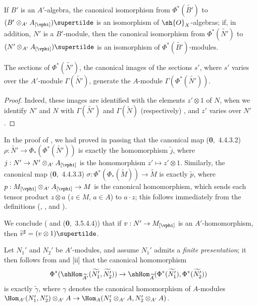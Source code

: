 If $B'$ is an $A'$-algebra, the canonical isomorphism from $\Phi^*(\widetilde{B'})$ to $(B'\otimes_{A'}A_{[\vphi]})\supertilde$ is an isomorphism of $\sh{O}_X$-algebras;
if, in addition, $N'$ is a $B'$-module, then the canonical isomorphism from $\Phi^*(\widetilde{N'})$ to $(N'\otimes_{A'}A_{[\vphi]})\supertilde$ is an isomorphism of $\Phi^*(\widetilde{B'})$-modules.

\begin{corollary}[1.6.6]
\label{I.1.6.6}
The sections of $\Phi^*(\widetilde{N'})$, the canonical images of the sections $s'$, where $s'$ varies over the $A'$-module $\Gamma(\widetilde{N'})$, generate the $A$-module $\Gamma(\Phi^*(\widetilde{N'}))$.
\end{corollary}

\begin{proof}
Indeed, these images are identified with the elements $z'\otimes 1$ of $N$, when we identify $N'$ and $N$ with $\Gamma(\widetilde{N'})$ and $\Gamma(\widetilde{N})$ (respectively) , and $z'$ varies over $N'$.
\end{proof}

\begin{env}[1.6.7]
\label{I.1.6.7}
In the proof of , we had proved in passing that the canonical map (\textbf{0},~4.4.3.2) $\rho:\widetilde{N'}\to\Phi_*(\Phi^*(\widetilde{N'}))$ is exactly the homomorphism $\widetilde{j}$,
where $j:N'\to N'\otimes_{A'}A_{[\vphi]}$ is the homomorphism $z'\mapsto z'\otimes 1$.
Similarly, the canonical map (\textbf{0},~4.4.3.3) $\sigma:\Phi^*(\Phi_*(\widetilde{M}))\to\widetilde{M}$ is exactly $\widetilde{p}$, where $p:M_{[\vphi]}\otimes_{A'}A_{[\vphi]}\to M$ is the canonical homomorphism, which sends each tensor product $z\otimes a$ ($z\in M$, $a\in A$) to $a\cdot z$;
this follows immediately from the definitions (, , and ).

We conclude ( and (\textbf{0},~3.5.4.4)) that if $v:N'\to M_{[\vphi]}$ is an $A'$-homomorphism, then $\widetilde{v}^\sharp=(v\otimes 1)\supertilde$.
\end{env}

\begin{env}[1.6.8]
\label{I.1.6.8}
Let $N_1'$ and $N_2'$ be $A'$-modules, and assume $N_1'$ admits a \emph{finite presentation};
it then follows from  and [ii] that the
canonical homomorphism 
\[
  \Phi^*(\shHom_{\widetilde{A'}}(\widetilde{N_1'},\widetilde{N_2'}))
  \to\shHom_{\widetilde{A}}(\Phi^*(\widetilde{N_1'}),\Phi^*(\widetilde{N_2'}))
\]
is exactly $\widetilde{\gamma}$, where $\gamma$ denotes the canonical homomorphism of $A$-modules $\Hom_{A'}(N_1',N_2')\otimes_{A'}A\to\Hom_A(N_1'\otimes_{A'}A,N_2'\otimes_{A'}A)$.
\end{env}

